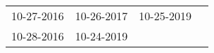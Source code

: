 \begin{supertabular}{llll}
 10-27-2016 &  10-26-2017 &  10-25-2019 \\
 10-28-2016 &  10-24-2019 &             \\
\end{supertabular}
